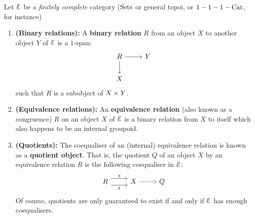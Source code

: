                    \begin{definition} \label{def: equivalence_relations}
                        Let $\mathcal{E}$ be a \textit{finitely complete} category ($\mathrm{Sets}$ or general topoi, or $1-1-1-\mathrm{Cat}$, for instance)
                            \begin{enumerate}
                                \item \textbf{(Binary relations):} A \textbf{binary relation} $R$ from an object $X$ to another object $Y$ of $\mathcal{E}$ is a $1$-span:
                                    $$
                                        \begin{tikzcd}
                                        	R & Y \\
                                        	X
                                        	\arrow[from=1-1, to=2-1]
                                        	\arrow[from=1-1, to=1-2]
                                        \end{tikzcd}
                                    $$
                                such that $R$ is a subobject of $X \x Y$. 
                                \item \textbf{(Equivalence relations):} An \textbf{equivalence relation} (also known as a congruence) $R$ on an object $X$ of $\mathcal{E}$ is a binary relation from $X$ to itself which also happens to be an internal groupoid. 
                                \item \textbf{(Quotients):} The coequaliser of an (internal) equivalence relation is known as a \textbf{quotient object}. That is, the quotient $Q$ of an object $X$ by an equivalence relation $R$ is the following coequaliser in $\mathcal{E}$:
                                    $$
                                        \begin{tikzcd}
                                        	R & X & Q
                                        	\arrow["s", shift left=2, from=1-1, to=1-2]
                                        	\arrow["t"', shift right=2, from=1-1, to=1-2]
                                        	\arrow[dashed, from=1-2, to=1-3]
                                        \end{tikzcd}
                                    $$
                                Of course, quotients are only guaranteed to exist if and only if $\mathcal{E}$ has enough coequalisers. 
                            \end{enumerate}
                    \end{definition}
                    
